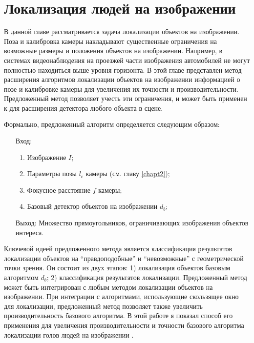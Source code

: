 
\chapter{Локализация людей на изображении} \label{chapt3}

В данной главе рассматривается задача локализации объектов на изображении. Поза и калибровка камеры накладывают существенные ограничения на возможные размеры и положения объектов на изображении. Например, в системах видеонаблюдения на проезжей части изображения автомобилей не могут полностью находиться выше уровня горизонта. В этой главе представлен метод расширения алгоритмов локализации объектов на изображении информацией о позе и калибровке камеры для увеличения их точности и производительности. Предложенный метод позволяет учесть эти ограничения, и может быть применен к для расширения детектора любого объекта в сцене.

Формально, предложенный алгоритм определяется следующим образом:
\begin{itemize}
	\item[Вход:]
	\begin{enumerate}
		\item Изображение $I$;
		\item Параметры позы $l_c$ камеры (см. главу \ref{chapt2});
		\item Фокусное расстояние $f$ камеры;
		\item Базовый детектор объектов на изображении $d_b$;
	\end{enumerate}
	\item[Выход:] Множество прямоугольников, ограничивающих изображения объектов интереса.
\end{itemize}

Ключевой идеей предложенного метода является классификация результатов локализации объектов на ``правдоподобные'' и ``невозможные'' с геометрической точки зрения. Он состоит из двух этапов: 1) локализация объектов базовым алгоритмом $d_b$; 2) классификация результатов локализации. Предложенный метод может быть интегрирован с любым методом локализации объектов на изображении. При интеграции с алгоритмами, использующие скользящее окно для локализации, предложенный метод позволяет также увеличить производительность базового алгоритма. В этой работе я показал способ его применения для увеличения производительности и точности базового алгоритма локализации голов людей на изображении \cite{prisacariu2009fasthog}.

